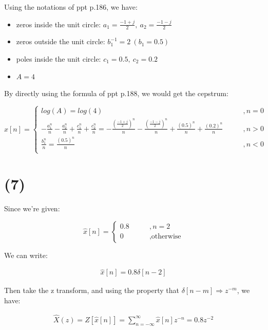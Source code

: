\documentclass{article}
\begin{document}
Using the notations of ppt p.186, we have:

\begin{itemize}
    \item zeros inside the unit circle: $a_1 = \frac{-1 + j}{2}, \ a_2 = \frac{-1 - j}{2}$
    \item zeros outside the unit circle: $b_1^{-1} = 2 \ (b_1 = 0.5)$
    \item poles inside the unit circle: $c_1 = 0.5, \ c_2 = 0.2$
    \item $A = 4$
\end{itemize}

By directly using the formula of ppt p.188, we would get the cepstrum:

\begin{equation*}
\hat{x}[n] = 
    \begin{cases}
    log(A) = log(4) \qquad &,n = 0\\
    - \frac{a_1^n}{n} - \frac{a_2^n}{n} + \frac{c_1^n}{n} + \frac{c_2^n}{n} = - \frac{(\frac{-1 + j}{2})^n}{n} - \frac{(\frac{-1 - j}{2})^n}{n} + \frac{(0.5)^n}{n} + \frac{(0.2)^n}{n} \qquad &,n > 0\\
    \frac{b_1^n}{n} =  \frac{(0.5)^n}{n} \qquad &,n < 0\\
    \end{cases}
\end{equation*}

\section*{(7)}

Since we're given:

\begin{equation*}
\hat{x}[n] = 
    \begin{cases}
    0.8 \qquad &,n = 2 \\
    0 &, \text{otherwise}
\end{cases}
\end{equation*}

We can write:

\begin{align*}
    \hat{x}[n] = 0.8 \delta[n - 2]
\end{align*}

Then take the z transform, and using the property that $\delta[n - m] \Rightarrow z^{-m}$, we have:

\begin{align*}
    \hat{X}(z) = Z[\hat{x}[n]] = \sum_{n=-\infty}^{\infty} \hat{x}[n] z^{-n} = 0.8 z^{-2}
\end{align*}
\end{document}
